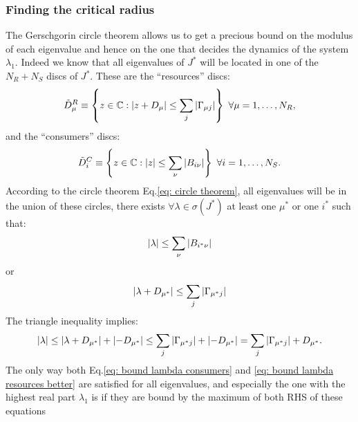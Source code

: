 \documentclass[12pt, titlepage, twoside, openright]{report}
\begin{document}
\subsubsection{Finding the critical radius}\label{sec : find critical radius}
\noindent The Gerschgorin circle theorem allows us to get a precious bound on the modulus of each eigenvalue and hence on the one that decides the dynamics of the system $\lambda_1$. Indeed we know that all eigenvalues of $J^*$ will be located in one of the $N_R + N_S$ discs of $J^*$. These are the ``resources'' discs:
\begin{equation}
\tilde{D}^R_\mu  \defined \left\{ z \in \mathbb{C}: \abs{z+D_\mu} \leq \sum_j \abs{\Gamma_{\mu j}} \right\}  \ \forall \mu = 1, \dots, N_R,
\end{equation}
and the ``consumers'' discs:
\begin{equation}
\tilde{D}^C_i \equiv \left\{ z \in \mathbb{C}: \left|{z}\right| \leq \sum_\nu \left|{B_{i\nu}}\right|\right\} \ \forall i=1, \dots, N_S.
\end{equation}
According to the circle theorem Eq.\eqref{eq: circle theorem}, all eigenvalues will be in the union of these circles, \ie there exists $\forall \lambda \in \sigma\left(J^*\right)$ at least one $\mu^*$ or  one $i^*$ such that:
\begin{equation}
\left|{\lambda}\right| \leq \sum_\nu \left|{B_{i^*\nu}}\right| \label{eq: bound lambda consumers}
\end{equation}
or
\begin{equation}
\left|{\lambda+D_{\mu^*}}\right| \leq \sum_j \left|{\Gamma_{\mu^* j}}\right| \label{eq: bound lambda 1 resources}
\end{equation}
The triangle inequality implies:
\begin{equation}
\left|{\lambda}\right| \leq \left|{\lambda+D_{\mu^*}}\right|+\left|{-D_{\mu^*}}\right| \leq \sum_j \left|{\Gamma_{\mu^* j}}\right| + \left|{-D_{\mu^*}}\right| = \sum_j \left|{\Gamma_{\mu^* j}}\right| + D_{\mu^*}.\label{eq: bound lambda resources better}
\end{equation}
The only way both Eq.\eqref{eq: bound lambda consumers} and \eqref{eq: bound lambda resources better} are satisfied for all eigenvalues, and especially the one with the highest real part $\lambda_1$ is if they are bound by the maximum of both RHS of these equations
\end{document}
